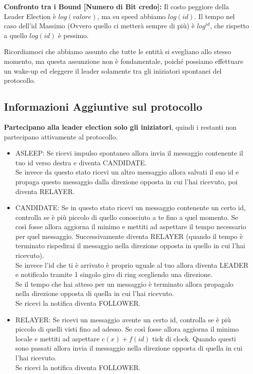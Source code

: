 \textbf{Confronto tra i Bound [Numero di Bit credo]:}
Il costo peggiore della Leader Election è $log(valore)$, ma su speed abbiamo
$log(id)$. Il tempo nel caso dell'id Massimo (Ovvero quello ci metterà sempre di
più) è $log^{id}$, che rispetto a quello $log(id)$ è pessimo.


Ricordiamoci che abbiamo assunto che tutte le entità si svegliano allo stesso
momento, ma questa assunzione non è fondamentale, poiché possiamo effettuare un
wake-up ed eleggere il leader solamente tra gli iniziatori spontanei del
protocollo.

\subsection{Informazioni Aggiuntive sul protocollo}
\textbf{Partecipano alla leader election solo gli iniziatori}, quindi i restanti
non partecipano attivamente al protocollo.

\begin{itemize}
    \item ASLEEP: Se ricevi impulso spontaneo allora invia il messaggio contenente
          il tuo id verso destra e diventa CANDIDATE.\\
          Se invece da questo stato ricevi un altro messaggio allora salvati il
          suo id e propaga questo messaggio dalla direzione opposta in cui l'hai
          ricevuto, poi diventa RELAYER.
    \item CANDIDATE: Se in questo stato ricevi un messaggio contenente un certo
          id, controlla se è più piccolo di quello conosciuto a te fino a quel momento.
          Se così fosse allora aggiorna il minimo e mettiti ad aspettare il tempo
          necessario per quel messaggio. Successivamente diventa RELAYER (quando il
          tempo è terminato rispedirai il messaggio nella direzione opposta in quello in
          cui l'hai ricevuto).\\
          Se invece l'id che ti è arrivato è proprio uguale al tuo allora diventa
          LEADER e notificalo tramite 1 singolo giro di ring scegliendo una
          direzione.\\
          Se il tempo che hai atteso per un messaggio è terminato allora propagalo
          nella direzione opposta di quella in cui l'hai ricevuto.\\
          Se ricevi la notifica diventa FOLLOWER.
    \item RELAYER: Se ricevi un messaggio avente un certo id, controlla se è più
          piccolo di quelli visti fino ad adesso. Se così fosse allora aggiorna il
          minimo locale e mettiti ad aspettare $c(x)+f(id)$ tick di clock. Quando questi
          sono passati allora invia il messaggio nella direzione opposta di quella in
          cui l'hai ricevuto.\\
          Se ricevi la notifica diventa FOLLOWER.

\end{itemize}

